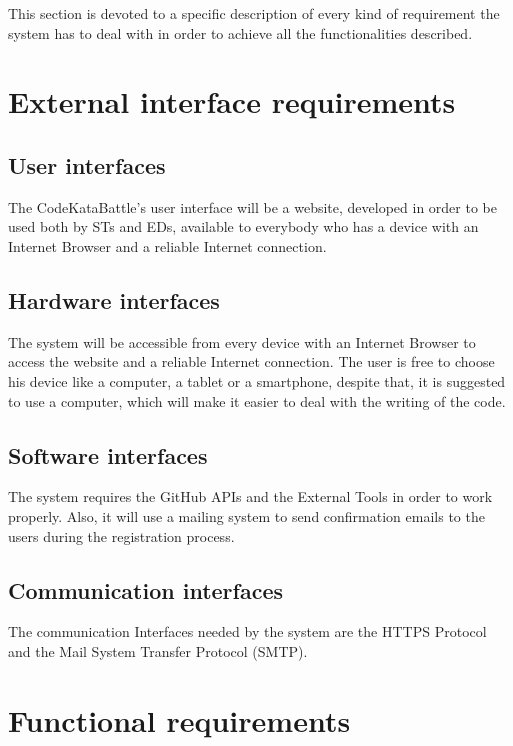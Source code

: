 This section is devoted to a specific description of every kind of requirement the system has to deal with in order to achieve all the functionalities described.

\newpage

\section{External interface requirements}
\label{sec:external_interface_requirements}%

\subsection{User interfaces}
\label{subsec:user_interfaces}%
The CodeKataBattle’s user interface will be a website, developed in order to be used both by STs and EDs, available to everybody who has a device with an Internet Browser and a reliable Internet connection.

\subsection{Hardware interfaces}
\label{subsec:hardware_interfaces}%
The system will be accessible from every device with an Internet Browser to access the website and a reliable Internet connection.
The user is free to choose his device like a computer, a tablet or a smartphone, despite that, it is suggested to use a computer, which will make it easier to deal with the writing of the code.


\subsection{Software interfaces}
\label{subsec:software_interfaces}%
The system requires the GitHub APIs and the External Tools in order to work properly. Also, it will use a mailing system to send confirmation emails to the users during the registration process.    

\subsection{Communication interfaces}
\label{subsec:communication_interfaces}%
The communication Interfaces needed by the system are the HTTPS Protocol and the Mail System Transfer Protocol (SMTP).

\section{Functional requirements}
\label{sec:functional_requirements}%

